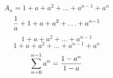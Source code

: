 \documentclass[11pt]{article}
\begin{document}
    \begin{equation}\label{eq:eq1}
    A_n = 1 + a + a^2 + \hdots + a^{n - 1} + a^n
    \end{equation}
    \begin{equation}\label{eq:eq2}
    {1 \over a} + 1 + a + a^2 + \hdots + a^{n - 1}
    \end{equation}
    \begin{equation}\label{eq:eq3}
    1 + a + a^2 + \hdots + a^{n - 1}
    \end{equation}
    \begin{equation}\label{eq:eq4}
    1 + a + a^2 + \hdots + a^{n - 1} + a^n
    \end{equation}
    \begin{equation}\label{eq:eq5}
    \sum_{n=0}^{n-1} a^n = {1 - a^n \over 1 - a}
    \end{equation}
\end{document}
